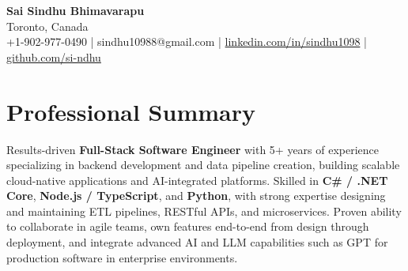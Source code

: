 \documentclass[letterpaper,11pt]{article}
\begin{document}
\begin{center}
  {\Large \textbf{Sai Sindhu Bhimavarapu}} \\
  Toronto, Canada \\
  +1-902-977-0490 \enspace | \enspace sindhu10988@gmail.com \enspace | \enspace \href{https://www.linkedin.com/in/sindhu1098/}{linkedin.com/in/sindhu1098} \enspace | \enspace \href{https://github.com/si-ndhu}{github.com/si-ndhu}
\end{center}

\section{Professional Summary}
  \begin{itemize}[leftmargin=0.15in, label={}]
    \small{\item{
     Results-driven \textbf{Full-Stack Software Engineer} with 5+ years of experience specializing in backend development and data pipeline creation, building scalable cloud-native applications and AI-integrated platforms. Skilled in \textbf{C\# / .NET Core}, \textbf{Node.js / TypeScript}, and \textbf{Python}, with strong expertise designing and maintaining ETL pipelines, RESTful APIs, and microservices. Proven ability to collaborate in agile teams, own features end-to-end from design through deployment, and integrate advanced AI and LLM capabilities such as GPT for production software in enterprise environments.
    }}
  \end{itemize}
\vspace{-16pt}

\end{document}
